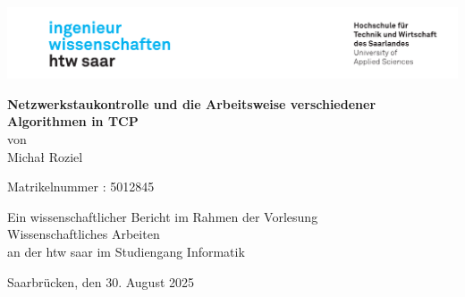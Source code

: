 \begin{titlepage}

\linespread{1.5}

\includegraphics[width=\linewidth]{graphics/htw_logo}

\begin{center}
    \large  
    \hfill
    \vfill
    \Large{\bfseries{Netzwerkstaukontrolle und die Arbeitsweise verschiedener Algorithmen in TCP}}\\
    
    von \\
    Michał Roziel

    Matrikelnummer : 5012845

    \vfill
		
    Ein wissenschaftlicher Bericht im Rahmen der Vorlesung\\
    \glqq Wissenschaftliches Arbeiten\grqq\\
    an der htw saar im Studiengang Informatik\\
	
    \vfill	
    \vfill
	
    Saarbrücken, den 30. August 2025
\end{center}
    
\end{titlepage}
